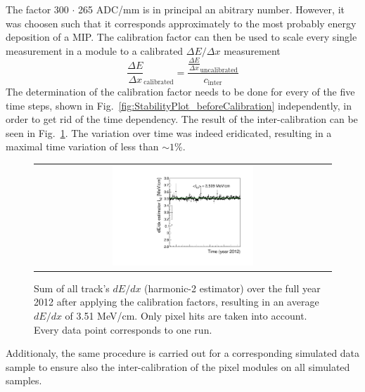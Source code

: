 The factor 300 $\cdot$ 265 ADC/mm is in principal an abitrary number. 
However, it was choosen such that it corresponds approximately to the most probably energy deposition of a MIP.
The calibration factor can then be used to scale every single measurement in a module to a calibrated $\Delta E/\Delta x$ measurement
\begin{equation*}
\frac{\Delta E}{\Delta x}_{\text{calibrated}}=\frac{\frac{\Delta E}{\Delta x}_{\text{uncalibrated}}}{c_{\text{inter}}}
\end{equation*}
The determination of the calibration factor needs to be done for every of the five time steps, shown in Fig.~\ref{fig:StabilityPlot_beforeCalibration} independently, in order to get rid of the time dependency. 
The result of the inter-calibration can be seen in Fig.~\ref{fig:StabilityPlot_afterCalibration}.
The variation over time was indeed eridicated, resulting in a maximal time variation of less than $\sim1$\%.
\begin{figure}[!bt]
  \centering 
  \begin{tabular}{c}
  \includegraphics[width=0.49\textwidth]{figures/analysis/StabilityPlot_Pixel_afterCalibration_withoutStepFits_NEW.pdf}
  \end{tabular}
  \caption{Sum of all track's $dE/dx$ (harmonic-2 estimator) over the full year 2012 after applying the calibration factors, resulting in an average $dE/dx$ of 3.51 MeV/cm. Only pixel hits are taken into account. Every data point corresponds to one run.} 
  \label{fig:StabilityPlot_afterCalibration}
\end{figure}

Additionaly, the same procedure is carried out for a corresponding simulated data sample to ensure also the inter-calibration of the pixel modules on all simulated samples.




